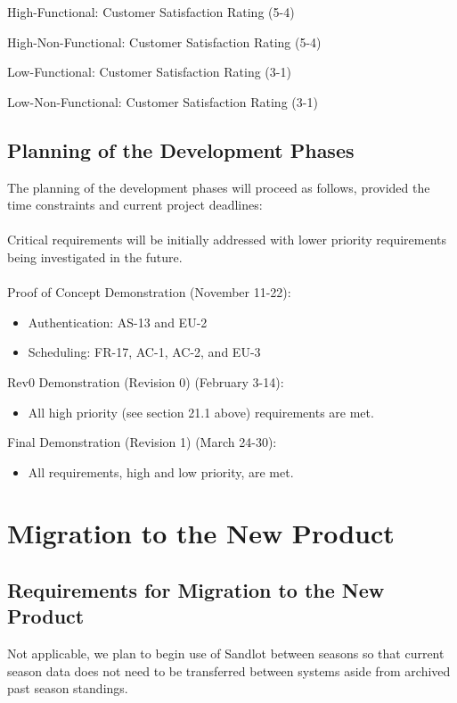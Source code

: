 \documentclass[12pt]{article}
\begin{document}
High-Functional: Customer Satisfaction Rating (5-4)

High-Non-Functional: Customer Satisfaction Rating (5-4)

Low-Functional: Customer Satisfaction Rating (3-1)

Low-Non-Functional: Customer Satisfaction Rating (3-1)

\subsection{Planning of the Development Phases}

The planning of the development phases will proceed as follows, provided the time
constraints and current project deadlines: \\\\
Critical requirements will be initially addressed with lower priority requirements
being investigated in the future. \\\\

Proof of Concept Demonstration (November 11-22):
\begin{itemize}
  \item Authentication: AS-13 and EU-2
  \item Scheduling: FR-17, AC-1, AC-2, and EU-3
\end{itemize}

Rev0 Demonstration (Revision 0) (February 3-14):
\begin{itemize}
  \item All high priority (see section 21.1 above) requirements are met.
\end{itemize}

Final Demonstration (Revision 1) (March 24-30):
\begin{itemize}
  \item All requirements, high and low priority, are met.
\end{itemize}

\section{Migration to the New Product}
\subsection{Requirements for Migration to the New Product}
Not applicable, we plan to begin use of Sandlot between seasons so that
current season data does not need to be transferred between systems aside from
archived past season standings.
\end{document}

